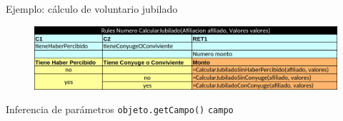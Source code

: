 \documentclass[10pt]{beamer}
\begin{document}
\begin{frame}{Ejemplo: cálculo de voluntario jubilado}
    \begin{figure}
        \centering
        \includegraphics[width=\textwidth]{tables/jubilado.png}
    \end{figure}
    \begin{block}{Inferencia de parámetros}
        \texttt{objeto.getCampo()} \rightarrow \texttt{campo}
    \end{block}
\end{frame}

\end{document}

